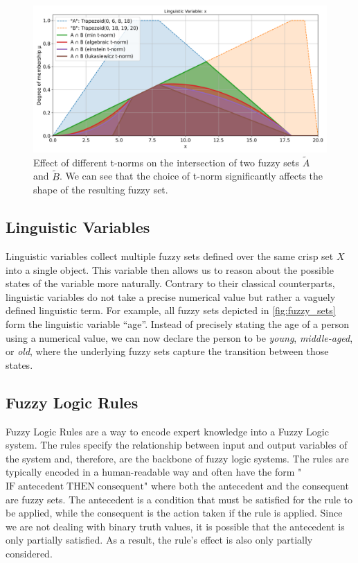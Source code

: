 \begin{figure}
      \centering
      \includegraphics[width=0.9\columnwidth,trim={0 0 0 0.85cm},clip]{figures/Intro/tnorms.png}
      \caption{Effect of different t-norms on the intersection of two fuzzy sets $\tilde{A}$ and $\tilde{B}$. We can see that the choice of t-norm significantly affects the shape of the resulting fuzzy set.}
      \label{fig:tnorms}
\end{figure}


\subsection{Linguistic Variables}

Linguistic variables collect multiple fuzzy sets defined over the same crisp set $X$ into a single object. This variable then allows us to reason about the possible states of the variable more naturally.
Contrary to their classical counterparts, linguistic variables do not take a precise numerical value but rather a vaguely defined linguistic term.
For example, all fuzzy sets depicted in \autoref{fig:fuzzy_sets} form the linguistic variable ``age''. Instead of precisely stating the age of a person using a numerical value, we can now declare the person to be \emph{young}, \emph{middle-aged}, or \emph{old}, where the underlying fuzzy sets capture the transition between those states.


\subsection{Fuzzy Logic Rules}

Fuzzy Logic Rules are a way to encode expert knowledge into a Fuzzy Logic system. The rules specify the relationship between input and output variables of the system and, therefore, are the backbone of fuzzy logic systems.
The rules are typically encoded in a human-readable way and often have the form "$\text{IF} \; \text{antecedent} \; \text{THEN} \; \text{consequent}$" where both the antecedent and the consequent are fuzzy sets. The antecedent is a condition that must be satisfied for the rule to be applied, while the consequent is the action taken if the rule is applied. Since we are not dealing with binary truth values, it is possible that the antecedent is only partially satisfied. As a result, the rule's effect is also only partially considered.


